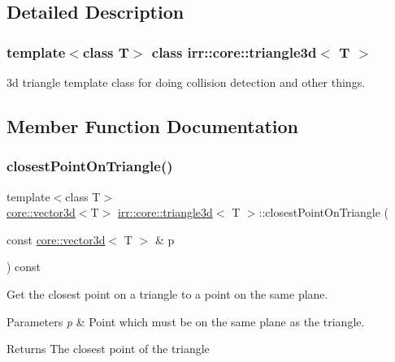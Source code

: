 \subsection{Detailed Description}
\subsubsection*{template$<$class T$>$\newline
class irr\+::core\+::triangle3d$<$ T $>$}

3d triangle template class for doing collision detection and other things. 

\subsection{Member Function Documentation}
\mbox{\label{classirr_1_1core_1_1triangle3d_a0212c09e6804a7a25c3fef791b6b1336}} 
\subsubsection{\texorpdfstring{closest\+Point\+On\+Triangle()}{closestPointOnTriangle()}}
{\footnotesize\ttfamily template$<$class T$>$ \\
\hyperlink{classirr_1_1core_1_1vector3d}{core\+::vector3d}$<$T$>$ \hyperlink{classirr_1_1core_1_1triangle3d}{irr\+::core\+::triangle3d}$<$ T $>$\+::closest\+Point\+On\+Triangle (\begin{DoxyParamCaption}\item[{const \hyperlink{classirr_1_1core_1_1vector3d}{core\+::vector3d}$<$ T $>$ \&}]{p }\end{DoxyParamCaption}) const\hspace{0.3cm}{\ttfamily [inline]}}



Get the closest point on a triangle to a point on the same plane. 


\begin{DoxyParams}{Parameters}
{\em p} & Point which must be on the same plane as the triangle. \\
\hline
\end{DoxyParams}
\begin{DoxyReturn}{Returns}
The closest point of the triangle 
\end{DoxyReturn}
\mbox{\label{classirr_1_1core_1_1triangle3d_a860339e3646bf2f7cbb7e88be1cf0783}} 
